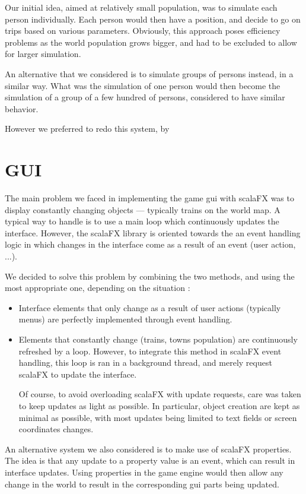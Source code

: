 \documentclass{article}
\begin{document}
Our initial idea, aimed at relatively small population, was to simulate each person individually.
Each person would then have a position, and decide to go on trips based on various parameters.
Obviously, this approach poses efficiency problems as the world population grows bigger,
and had to be excluded to allow for larger simulation.

An alternative that we considered is to simulate groups of persons instead, in a similar way.
What was the simulation of one person would then become the simulation of a group of a few hundred of persons,
considered to have similar behavior.

However we preferred to redo this system, by 


\section{GUI}
The main problem we faced in implementing the game gui with scalaFX was to display constantly changing objects ---
typically trains on the world map. A typical way to handle is to use a main loop which continuously updates the interface.
However, the scalaFX library is oriented towards the an event handling logic
in which changes in the interface come as a result of an event (user action, ...).

We decided to solve this problem by combining the two methods, 
and using the most appropriate one, depending on the situation :
\begin{itemize}
\item Interface elements that only change as a result of user actions (typically menus) 
are perfectly implemented through event handling.

\item Elements that constantly change (trains, towns population) are continuously refreshed by a loop.
However, to integrate this method in scalaFX event handling, this loop is ran in a background thread,
and merely request scalaFX to update the interface.

Of course, to avoid overloading scalaFX with update requests, care was taken to keep updates as light as possible.
In particular, object creation are kept as minimal as possible, with most updates being limited to text fields
or screen coordinates changes.
\end{itemize}

An alternative system we also considered is to make use of scalaFX properties.
The idea is that any update to a property value is an event, which can result in interface updates.
Using properties in the game engine would then allow any change in the world to result in the corresponding
gui parts being updated.
\end{document}
